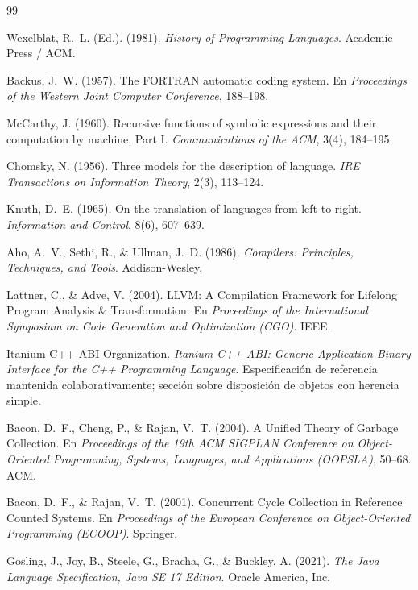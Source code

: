 \documentclass[12pt, a4paper]{article}
\begin{document}
\begin{thebibliography}{99}

Wexelblat, R.~L. (Ed.). (1981). \textit{History of Programming Languages}.
Academic Press / ACM.

Backus, J.~W. (1957). The FORTRAN automatic coding system. En
\textit{Proceedings of the Western Joint Computer Conference}, 188--198.

McCarthy, J. (1960). Recursive functions of symbolic expressions and their
computation by machine, Part I. \textit{Communications of the ACM}, 3(4),
184--195.

Chomsky, N. (1956). Three models for the description of language.
\textit{IRE Transactions on Information Theory}, 2(3), 113--124.

Knuth, D.~E. (1965). On the translation of languages from left to right.
\textit{Information and Control}, 8(6), 607--639.

Aho, A.~V., Sethi, R., \& Ullman, J.~D. (1986). \textit{Compilers:
Principles, Techniques, and Tools}. Addison-Wesley.

Lattner, C., \& Adve, V. (2004). LLVM: A Compilation Framework for Lifelong
Program Analysis \& Transformation. En \textit{Proceedings of the
International Symposium on Code Generation and Optimization (CGO)}. IEEE.

Itanium C++ ABI Organization. \textit{Itanium C++ ABI: Generic Application
Binary Interface for the C++ Programming Language}. Especificación de
referencia mantenida colaborativamente; sección sobre disposición de objetos
con herencia simple.

Bacon, D.~F., Cheng, P., \& Rajan, V.~T. (2004). A Unified Theory of Garbage
Collection. En \textit{Proceedings of the 19th ACM SIGPLAN Conference on
Object-Oriented Programming, Systems, Languages, and Applications (OOPSLA)},
50--68. ACM.

Bacon, D.~F., \& Rajan, V.~T. (2001). Concurrent Cycle Collection in
Reference Counted Systems. En \textit{Proceedings of the European Conference
on Object-Oriented Programming (ECOOP)}. Springer.

Gosling, J., Joy, B., Steele, G., Bracha, G., \& Buckley, A. (2021).
\textit{The Java Language Specification, Java SE 17 Edition}. Oracle
America, Inc.


\end{thebibliography}
\end{document}
